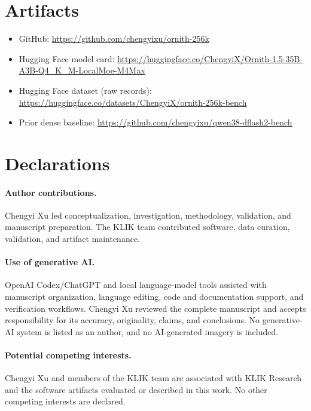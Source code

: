 \documentclass[11pt]{article}
\begin{document}
\section*{Artifacts}
\begin{sloppypar}
\begin{itemize}
\item GitHub: \url{https://github.com/chengyixu/ornith-256k}
\item Hugging Face model card: \url{https://huggingface.co/ChengyiX/Ornith-1.5-35B-A3B-Q4_K_M-LocalMoe-M4Max}
\item Hugging Face dataset (raw records): \url{https://huggingface.co/datasets/ChengyiX/ornith-256k-bench}
\item Prior dense baseline: \url{https://github.com/chengyixu/qwen38-dflash2-bench}
\end{itemize}
\end{sloppypar}

\section*{Declarations}
\paragraph{Author contributions.} Chengyi Xu led conceptualization, investigation, methodology, validation, and manuscript preparation. The KLIK team contributed software, data curation, validation, and artifact maintenance.
\paragraph{Use of generative AI.} OpenAI Codex/ChatGPT and local language-model tools assisted with manuscript organization, language editing, code and documentation support, and verification workflows. Chengyi Xu reviewed the complete manuscript and accepts responsibility for its accuracy, originality, claims, and conclusions. No generative-AI system is listed as an author, and no AI-generated imagery is included.
\paragraph{Potential competing interests.} Chengyi Xu and members of the KLIK team are associated with KLIK Research and the software artifacts evaluated or described in this work. No other competing interests are declared.
\end{document}
